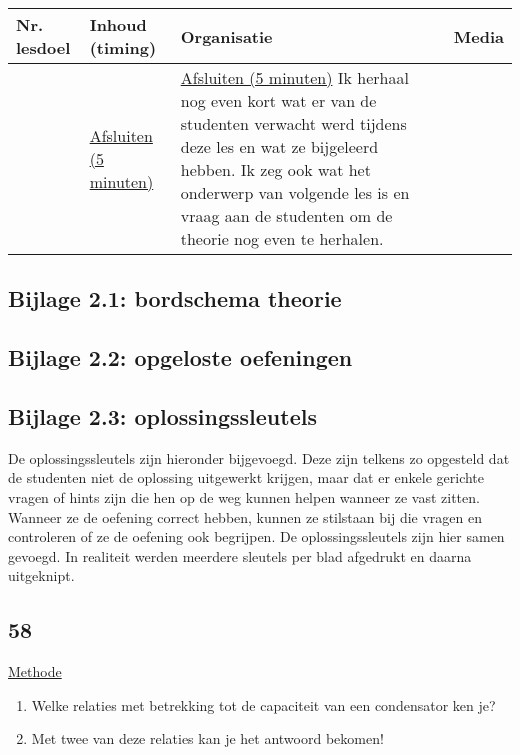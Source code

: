 \begin{landscape}
	


\begin{tabularx}{1.56\textwidth}{|p{1.5cm}|p{6cm}|X|p{4cm}|}
	\hline
	\textbf{Nr. lesdoel } & \textbf{Inhoud (timing)}  & \textbf{Organisatie } & \textbf{Media } \\ \hline
	&\underline{Afsluiten (5 minuten)}\newline 
	&  \underline{Afsluiten (5 minuten)}\newline
	Ik herhaal nog even kort wat er van de studenten verwacht werd tijdens deze les en wat ze bijgeleerd hebben. Ik zeg ook wat het onderwerp van volgende les is en vraag aan de studenten om de theorie nog even te herhalen.
	& 
	\\ \hline
\end{tabularx}
	
	
	
	
	
\end{landscape}



\subsection*{Bijlage 2.1: bordschema theorie}
\subsection*{Bijlage 2.2: opgeloste oefeningen}


\subsection*{Bijlage 2.3: oplossingssleutels}
De oplossingssleutels zijn hieronder bijgevoegd. Deze zijn telkens zo opgesteld dat de studenten niet de oplossing uitgewerkt krijgen, maar dat er enkele gerichte vragen of hints zijn die hen op de weg kunnen helpen wanneer ze vast zitten. Wanneer ze de oefening correct hebben, kunnen ze stilstaan bij die vragen en controleren of ze de oefening ook begrijpen.\newline
De oplossingssleutels zijn hier samen gevoegd. In realiteit werden meerdere sleutels per blad afgedrukt en daarna uitgeknipt.

\subsection*{58}
\underline{Methode}
\begin{enumerate}
	\item Welke relaties met betrekking tot de capaciteit van een condensator ken je? 
	\item Met twee van deze relaties kan je het antwoord bekomen!
\end{enumerate}

